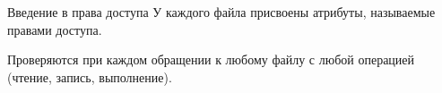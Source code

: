 \begin{frame}{Введение в права доступа}
  У каждого файла присвоены атрибуты, называемые \alert{правами доступа}.\newline
  
  Проверяются при каждом обращении к любому файлу с любой операцией (чтение, запись, выполнение).\newline \pause

\end{frame}
